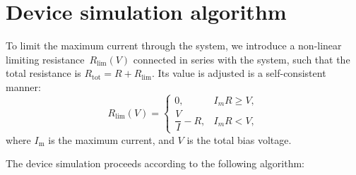 \documentclass[10pt]{article}
\begin{document}
\section{Device simulation algorithm}

To limit the maximum current through the system, we introduce a non-linear
limiting resistance~$R_\mathrm{lim}(V)$ connected in series with the system, such
that the total resistance is $R_\mathrm{tot} = R + R_\mathrm{lim}$. Its value is
adjusted is a self-consistent manner:
\begin{equation}
	R_\mathrm{lim}(V) =
		\begin{cases}
			0,					& I_m R \geq V, \\
			\dfrac{V}{I} - R, 	& I_m R < V,
		\end{cases}
\end{equation}
where $I_\mathrm{m}$ is the maximum current, and $V$ is the total bias voltage.

The device simulation proceeds according to the following algorithm:
\end{document}
